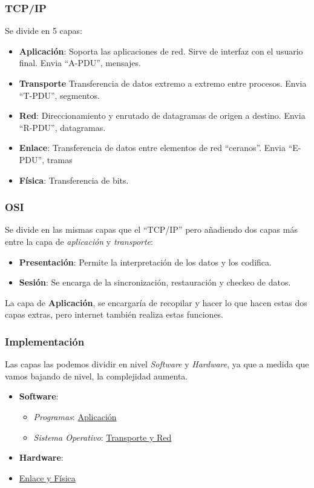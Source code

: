 \subsubsection{TCP/IP}
\noindent Se divide en 5 capas:
\begin{itemize}
        \item \textbf{Aplicación}: Soporta las aplicaciones de red. Sirve de interfaz con el usuario final. Envia ``A-PDU'', mensajes.
        \item \textbf{Transporte} Transferencia de datos extremo a extremo entre procesos. Envia ``T-PDU'', segmentos.
        \item \textbf{Red}: Direccionamiento y enrutado de datagramas de origen a destino. Envia ``R-PDU'', datagramas.
        \item \textbf{Enlace}: Transferencia de datos entre elementos de red ``ceranos''. Envia ``E-PDU'', tramas
        \item \textbf{Física}: Transferencia de bits.
\end{itemize}
\subsubsection{OSI}
\noindent Se divide en las mismas capas que el ``TCP/IP'' pero añadiendo dos capas más entre la capa de \textit{aplicación} y \textit{transporte}:
\begin{itemize}
        \item \textbf{Presentación}: Permite la interpretación de los datos y los codifica.
        \item \textbf{Sesión}: Se encarga de la sincronización, restauración y checkeo de datos.
\end{itemize}
\noindent La capa de \textbf{Aplicación}, se encargaría de recopilar y hacer lo que hacen estas dos capas extras, pero internet también realiza estas funciones.
\subsubsection{Implementación}
\noindent Las capas las podemos dividir en nivel \textit{Software} y \textit{Hardware}, ya que a medida que vamos bajando de nivel, la complejidad aumenta.
\begin{itemize}
        \item \textbf{Software}:
              \begin{itemize}
                      \item \textit{Programas}: \underline{Aplicación}
                      \item \textit{Sistema Operativo}: \underline{Transporte y Red}
              \end{itemize}
        \item \textbf{Hardware}:
        \item \underline{Enlace y Física}
\end{itemize}